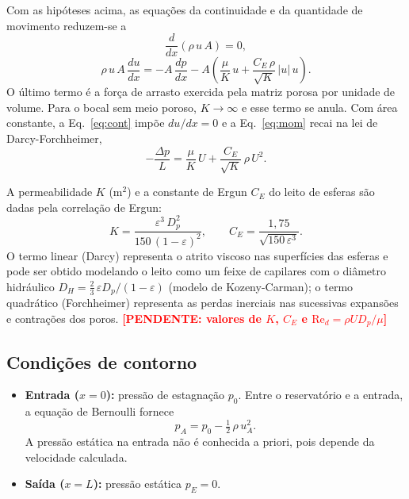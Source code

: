 \documentclass[11pt,a4paper]{article}
\newcommand{\pendente}[1]{\textcolor{red}{\textbf{[PENDENTE: #1]}}}
\begin{document}
Com as hipóteses acima, as equações da continuidade e da quantidade de
movimento reduzem-se a
\begin{equation}
  \frac{d}{dx}\left(\rho\,u\,A\right)=0 ,
  \label{eq:cont}
\end{equation}
\begin{equation}
  \rho\,u\,A\,\frac{du}{dx}
  =-A\,\frac{dp}{dx}
  -A\left(\frac{\mu}{K}\,u+\frac{C_E\,\rho}{\sqrt{K}}\,|u|\,u\right) .
  \label{eq:mom}
\end{equation}
O último termo é a força de arrasto exercida pela matriz porosa por
unidade de volume. Para o bocal sem meio poroso, $K\to\infty$ e esse termo
se anula. Com área constante, a Eq.~\eqref{eq:cont} impõe $du/dx=0$ e a
Eq.~\eqref{eq:mom} recai na lei de Darcy-Forchheimer,
\begin{equation}
  -\frac{\Delta p}{L}=\frac{\mu}{K}\,U+\frac{C_E}{\sqrt{K}}\,\rho\,U^2 .
\end{equation}

A permeabilidade $K$ (m$^2$) e a constante de Ergun $C_E$ do leito de
esferas são dadas pela correlação de Ergun:
\begin{equation}
  K=\frac{\varepsilon^3\,D_p^2}{150\,(1-\varepsilon)^2},
  \qquad
  C_E=\frac{1{,}75}{\sqrt{150\,\varepsilon^3}} .
  \label{eq:ergun}
\end{equation}
O termo linear (Darcy) representa o atrito viscoso nas superfícies das
esferas e pode ser obtido modelando o leito como um feixe de capilares
com o diâmetro hidráulico
$D_H=\tfrac{2}{3}\,\varepsilon D_p/(1-\varepsilon)$ (modelo de
Kozeny-Carman); o termo quadrático (Forchheimer) representa as perdas
inerciais nas sucessivas expansões e contrações dos poros.
\pendente{valores de $K$, $C_E$ e $\mathrm{Re}_d=\rho U D_p/\mu$}

\subsection{Condições de contorno}

\begin{itemize}
  \item \textbf{Entrada ($x=0$):} pressão de estagnação $p_0$. Entre o
        reservatório e a entrada, a equação de Bernoulli fornece
        \begin{equation}
          p_A=p_0-\tfrac12\,\rho\,u_A^2 .
          \label{eq:bern}
        \end{equation}
        A pressão estática na entrada não é conhecida a priori, pois depende
        da velocidade calculada.
  \item \textbf{Saída ($x=L$):} pressão estática $p_E=0$.
\end{itemize}
\end{document}
